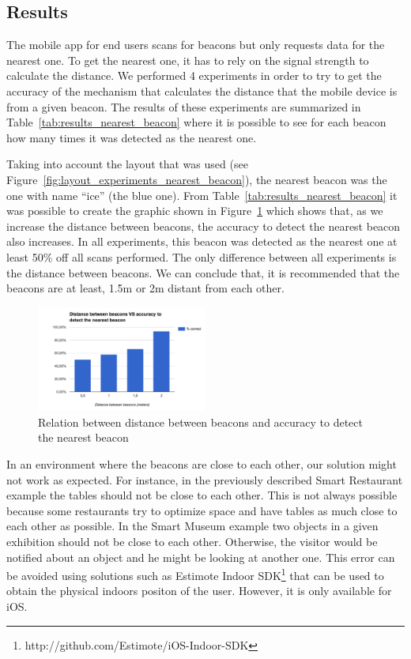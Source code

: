 \subsection{Results}
\label{sub:evaluation_nearest_beacon_results}
The mobile app for end users scans for beacons but only requests data for the nearest one. To get the nearest one, it has to rely on the signal strength to calculate the distance. We performed 4 experiments in order to try to get the accuracy of the mechanism that calculates the distance that the mobile device is from a given beacon.
The results of these experiments are summarized in Table~\ref{tab:results_nearest_beacon} where it is possible to see for each beacon how many times it was detected as the nearest one.

Taking into account the layout that was used (see Figure~\ref{fig:layout_experiments_nearest_beacon}), the nearest beacon was the one with name ``ice'' (the blue one).
From Table~\ref{tab:results_nearest_beacon} it was possible to create the graphic shown in Figure~\ref{fig:results_experiments_nearest_beacon} which shows that, as we increase the distance between beacons, the accuracy to detect the nearest beacon also increases.
In all experiments, this beacon was detected as the nearest one at least 50\% off all scans performed.
The only difference between all experiments is the distance between beacons.
We can conclude that, it is recommended that the beacons are at least, 1.5m or 2m distant from each other.



\begin{figure}[!ht]
  \centering
    \includegraphics[width=0.5\textwidth, keepaspectratio]{images/results_nearest_beacon}
    \caption[Distance between beacons vs Accuracy]{Relation between distance between beacons and accuracy to detect the nearest beacon}
    \label{fig:results_experiments_nearest_beacon}
\end{figure}

In an environment where the beacons are close to each other, our solution might not work as expected.
For instance, in the previously described Smart Restaurant example
the tables should not be close to each other. This is not always possible because some restaurants try to optimize space and have tables as much close to each other as possible.
In the Smart Museum example two objects in a given exhibition should not be close to each other.
Otherwise, the visitor would be notified about an object and he might be looking at another one.
This error can be avoided using solutions such as Estimote Indoor \gls{SDK}\footnote{http://github.com/Estimote/iOS-Indoor-SDK} that can be used to obtain the physical indoors positon of the user.
However, it is only available for iOS.

